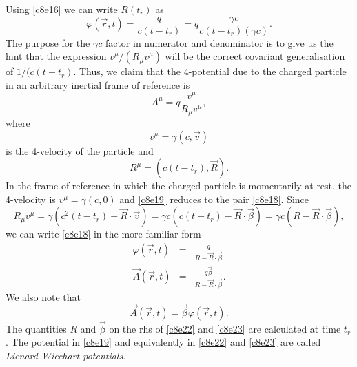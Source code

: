 \begin{enumerate}
Using \eqref{c8e16} we can write $R(t_r)$ as
\begin{equation}\label{c8e18}
\varphi(\vec{r}, t)=\frac{q}{c(t - t_r)}=q\frac{\gamma c}{c(t - t_r)(\gamma c)}.
\end{equation}
The purpose for the $\gamma c$ factor in numerator and denominator is to give
us the hint that the expression $v^\mu/(R_\mu v^\mu)$ will be the correct
covariant generalisation of $1/(c(t - t_r)$. Thus, we claim that the 4-potential
due to the charged particle in an arbitrary inertial frame of reference is
\begin{equation}\label{c8e19}
A^\mu = q\frac{v^\mu}{R_\mu v^\mu},
\end{equation}
where
\begin{equation}\label{c8e20}
v^\mu = \gamma(c, \vec{v})
\end{equation}
is the 4-velocity of the particle and
\begin{equation}\label{c8e21}
R^\mu = (c(t - t_r), \vec{R}).
\end{equation}
In the frame of reference in which the charged particle is momentarily at rest,
the 4-velocity is $v^\mu = \gamma(c, 0)$ and \eqref{c8e19} reduces to the pair
\eqref{c8e18}. Since 
\[
R_\mu v^\mu = \gamma(c^2(t - t_r) - \vec{R}\cdot\vec{v}) = \gamma c(c(t-t_r) 
- \vec{R}\cdot\vec{\beta}) = \gamma c(R - \vec{R}\cdot\vec{\beta}),
\]
we can write \eqref{c8e18} in the more familiar form
\begin{eqnarray}
\varphi(\vec{r}, t) &=& \frac{q}{R - \vec{R}\cdot\vec{\beta}} \label{c8e22} \\
\vec{A}(\vec{r}, t) &=& \frac{q\vec{\beta}}{R - \vec{R}\cdot\vec{\beta}}.
\label{c8e23}
\end{eqnarray}
We also note that
\begin{equation}\label{c8e24}
\vec{A}(\vec{r}, t) = \vec{\beta}\varphi(\vec{r}, t).
\end{equation}
The quantities $R$ and $\vec{\beta}$ on the rhs of \eqref{c8e22} and 
\eqref{c8e23} are calculated at time $t_r$. The potential in \eqref{c8e19} and
equivalently in \eqref{c8e22} and \eqref{c8e23} are called 
\emph{Lienard-Wiechart potentials}.


\end{enumerate}
